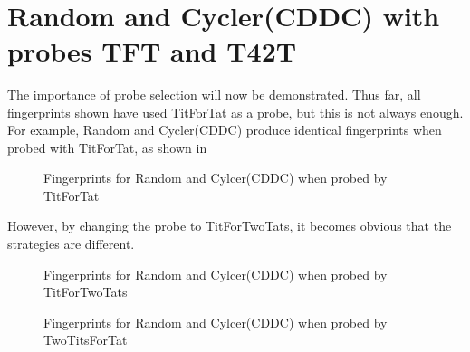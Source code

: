 \begin{figure}[htbp!]
\\
\end{figure}



\section{Random and Cycler(CDDC) with probes TFT and T42T}
The importance of probe selection will now be demonstrated.
Thus far, all fingerprints shown have used TitForTat as a probe, but this is not always enough.
For example, Random and Cycler(CDDC) produce identical fingerprints when probed with TitForTat, as shown in

\begin{figure}[htbp!]
    \centering
    \caption{Fingerprints for Random and Cylcer(CDDC) when probed by TitForTat}
    \label{fig:rand_cycle_tft}
\end{figure}

However, by changing the probe to TitForTwoTats, it becomes obvious that the strategies are different.

\begin{figure}[htbp!]
    \centering
    \caption{Fingerprints for Random and Cylcer(CDDC) when probed by TitForTwoTats}
    \label{fig:rand_cycle_tf2t}
\end{figure}

\begin{figure}[htbp!]
    \centering
    \caption{Fingerprints for Random and Cylcer(CDDC) when probed by TwoTitsForTat}
    \label{fig:rand_cycle_2tft}
\end{figure}



